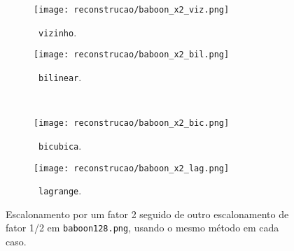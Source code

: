\begin{figure}[H]
    \centering
    \begin{subfigure}{0.3\textwidth}
        \centering
        \texttt{[image: reconstrucao/baboon\_x2\_viz.png]}
        \caption{~\texttt{vizinho}.}
    \end{subfigure}%
    \hspace{8pt}
    \begin{subfigure}{0.3\textwidth}
        \centering
        \texttt{[image: reconstrucao/baboon\_x2\_bil.png]}
        \caption{~\texttt{bilinear}.}
    \end{subfigure}
    \\[8pt]
    \begin{subfigure}{0.3\textwidth}
        \centering
        \texttt{[image: reconstrucao/baboon\_x2\_bic.png]}
        \caption{~\texttt{bicubica}.}
    \end{subfigure}%
    \hspace{8pt}%
    \begin{subfigure}{0.3\textwidth}
        \centering
        \texttt{[image: reconstrucao/baboon\_x2\_lag.png]}
        \caption{~\texttt{lagrange}.}
    \end{subfigure}

    \caption{Escalonamento por um fator 2 seguido de outro escalonamento de fator 1/2 em \texttt{baboon128.png}, usando o mesmo método em cada caso.}
    \label{fig:rec:x2}
\end{figure}